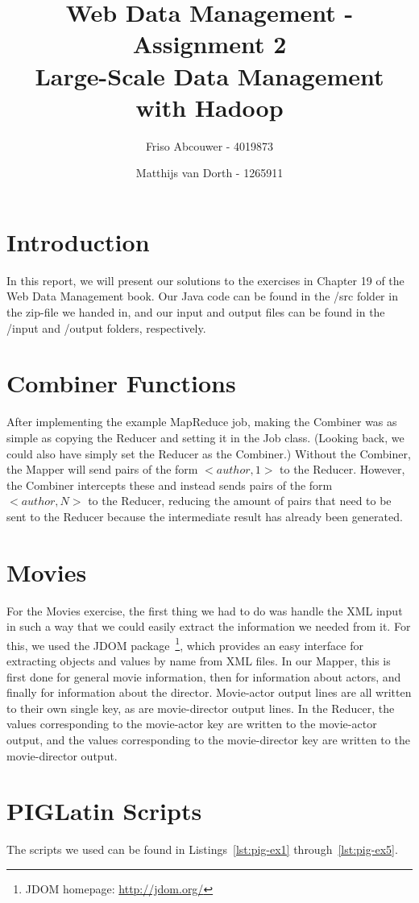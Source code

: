 \documentclass[11pt]{article}
\title{Web Data Management - Assignment 2 \\ Large-Scale Data Management with Hadoop}
\author{Friso Abcouwer - 4019873 \and Matthijs van Dorth - 1265911}
\begin{document}
\maketitle

\section{Introduction}
In this report, we will present our solutions to the exercises in Chapter 19 of the Web Data Management book.
Our Java code can be found in the /src folder in the zip-file we handed in, and our input and output files can be found in the /input and /output folders, respectively.

\section{Combiner Functions}
After implementing the example MapReduce job, making the Combiner was as simple as copying the Reducer and setting it in the Job class. (Looking back, we could also have simply set the Reducer as the Combiner.)
Without the Combiner, the Mapper will send pairs of the form $<author, 1>$ to the Reducer. However, the Combiner intercepts these and instead sends pairs of the form $<author,N>$ to the Reducer, reducing the amount of pairs that need to be sent to the Reducer because the intermediate result has already been generated.

\section{Movies}
For the Movies exercise, the first thing we had to do was handle the XML input in such a way that we could easily extract the information we needed from it.
For this, we used the JDOM package~\footnote{JDOM homepage: \url{http://jdom.org/}}, which provides an easy interface for extracting objects and values by name from XML files.
In our Mapper, this is first done for general movie information, then for information about actors, and finally for information about the director. Movie-actor output lines are all written to their own single key, as are movie-director output lines. In the Reducer, the values corresponding to the movie-actor key are written to the movie-actor output, and the values corresponding to the movie-director key are written to the movie-director output.

\section{PIGLatin Scripts}
The scripts we used can be found in Listings~\ref{lst:pig-ex1} through~\ref{lst:pig-ex5}.
\end{document}
